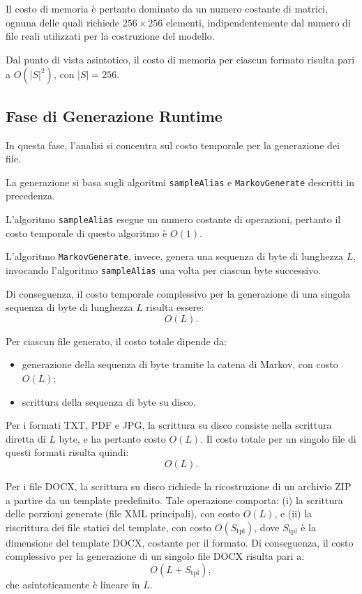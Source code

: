 \documentclass{report}
\begin{document}
\bigskip

Il costo di memoria è pertanto dominato da un numero costante di matrici, ognuna delle quali richiede
$256 \times 256$ elementi, indipendentemente dal numero di file reali utilizzati per la costruzione del modello.

\bigskip

Dal punto di vista asintotico, il costo di memoria per ciascun formato risulta
pari a $O(|S|^2)$, con $|S| = 256$.

\subsection{Fase di Generazione Runtime}

In questa fase, l'analisi si concentra sul costo temporale per la generazione dei file.

\bigskip

La generazione si basa sugli algoritmi \texttt{sampleAlias} e \texttt{MarkovGenerate} descritti in precedenza.

\bigskip

L'algoritmo \texttt{sampleAlias} esegue un numero costante di operazioni, 
pertanto il costo temporale di questo algoritmo è \(O(1)\).

\bigskip

L'algoritmo \texttt{MarkovGenerate}, invece, genera una sequenza di byte di lunghezza \(L\),
invocando l'algoritmo \texttt{sampleAlias} una volta per ciascun byte successivo.

Di conseguenza, il costo temporale complessivo per la generazione di una singola sequenza
di byte di lunghezza \(L\) risulta essere:
\[
O(L).
\]

\bigskip

Per ciascun file generato, il costo totale dipende da:
\begin{itemize}
    \item generazione della sequenza di byte tramite la catena di Markov, con costo \(O(L)\);
    \item scrittura della sequenza di byte su disco.
\end{itemize}

Per i formati TXT, PDF e JPG, la scrittura su disco consiste nella scrittura
diretta di \(L\) byte, e ha pertanto costo \(O(L)\).
Il costo totale per un singolo file di questi formati risulta quindi:
\[
O(L).
\]

\bigskip

Per i file DOCX, la scrittura su disco richiede la ricostruzione di un archivio ZIP
a partire da un template predefinito.
Tale operazione comporta:
(i) la scrittura delle porzioni generate (file XML principali), con costo \(O(L)\),
e (ii) la riscrittura dei file statici del template, con costo \(O(S_{\text{tpl}})\),
dove \(S_{\text{tpl}}\) è la dimensione del template DOCX, costante per il formato.
Di conseguenza, il costo complessivo per la generazione di un singolo file DOCX
risulta pari a:
\[
O(L + S_{\text{tpl}}),
\]
che asintoticamente è lineare in \(L\).
\end{document}

